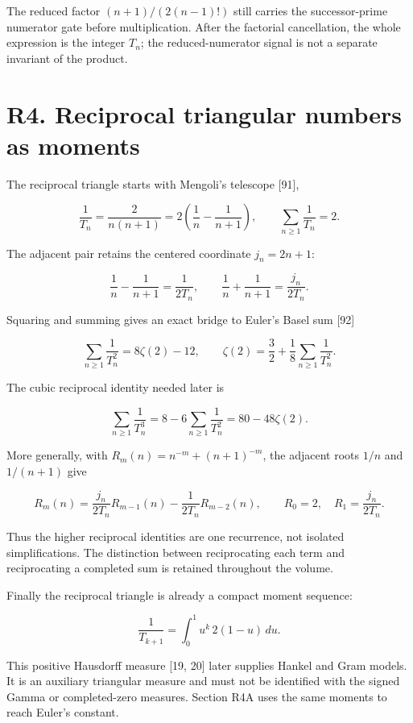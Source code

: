 \documentclass[
  11pt,
]{book}
\begin{document}
The reduced factor \((n+1)/(2(n-1)!)\) still carries the successor-prime
numerator gate before multiplication. After the factorial cancellation,
the whole expression is the integer \(T_n\); the reduced-numerator
signal is not a separate invariant of the product.

\section{R4. Reciprocal triangular numbers as
moments}\label{r4.-reciprocal-triangular-numbers-as-moments}

The reciprocal triangle starts with Mengoli's telescope {[}91{]},

\[
\frac1{T_n}=\frac2{n(n+1)}
=2\left(\frac1n-\frac1{n+1}\right),
\qquad
\sum_{n\ge1}\frac1{T_n}=2.
\tag{4.1}
\]

The adjacent pair retains the centered coordinate \(j_n=2n+1\):

\[
\frac1n-\frac1{n+1}=\frac1{2T_n},\qquad
\frac1n+\frac1{n+1}=\frac{j_n}{2T_n}.
\tag{4.2}
\]

Squaring and summing gives an exact bridge to Euler's Basel sum {[}92{]}

\[
\boxed{\sum_{n\ge1}\frac1{T_n^2}=8\zeta(2)-12,
\qquad
\zeta(2)=\frac32+\frac18\sum_{n\ge1}\frac1{T_n^2}.}
\tag{4.4}
\]

The cubic reciprocal identity needed later is

\[
\boxed{\sum_{n\ge1}\frac1{T_n^3}
=8-6\sum_{n\ge1}\frac1{T_n^2}
=80-48\zeta(2).}
\tag{4.4f}
\]

More generally, with \(R_m(n)=n^{-m}+(n+1)^{-m}\), the adjacent roots
\(1/n\) and \(1/(n+1)\) give

\[
R_m(n)=\frac{j_n}{2T_n}R_{m-1}(n)
-\frac1{2T_n}R_{m-2}(n),
\qquad R_0=2,
\quad R_1=\frac{j_n}{2T_n}.
\tag{4.4b}
\]

Thus the higher reciprocal identities are one recurrence, not isolated
simplifications. The distinction between reciprocating each term and
reciprocating a completed sum is retained throughout the volume.

Finally the reciprocal triangle is already a compact moment sequence:

\[
\boxed{\frac1{T_{k+1}}
=\int_0^1u^k\,2(1-u)\,du.}
\tag{4.5}
\]

This positive Hausdorff measure {[}19, 20{]} later supplies Hankel and
Gram models. It is an auxiliary triangular measure and must not be
identified with the signed Gamma or completed-zero measures. Section R4A
uses the same moments to reach Euler's constant.
\end{document}
